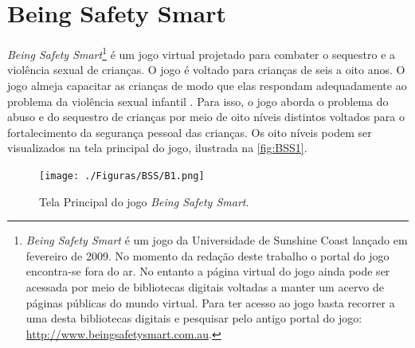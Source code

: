 
\section{Being Safety Smart}\label{sssec:Being}


\textit{Being Safety Smart}\footnote{\textit{Being Safety Smart} é um jogo  da Universidade de Sunshine Coast lançado em fevereiro de 2009. No momento da redação deste trabalho o portal do jogo encontra-se fora do ar. No entanto a página virtual do jogo ainda pode ser acessada por meio de bibliotecas digitais voltadas a manter um acervo de páginas públicas do mundo virtual. Para ter acesso ao jogo basta recorrer a uma desta bibliotecas digitais e pesquisar pelo antigo portal do jogo: \url{http://www.beingsafetysmart.com.au}.} é um jogo virtual projetado para combater o sequestro e a violência sexual de crianças. O jogo é voltado para crianças de seis a oito anos. O jogo almeja capacitar as crianças de modo que elas respondam adequadamente ao problema da violência sexual infantil \cite{jones2008online}. Para isso, o jogo aborda  o problema do abuso e do sequestro de crianças por meio de oito níveis distintos voltados para o fortalecimento da segurança pessoal das crianças. Os oito níveis podem ser visualizados na tela principal do jogo, ilustrada na \autoref{fig:BSS1}. 


\begin{figure}[htb]
	\caption{\label{fig:BSS1}Tela Principal do jogo \textit{Being Safety Smart}.}
  \begin{center}\vspace{-0.3cm}
    \texttt{[image: ./Figuras/BSS/B1.png]}
	\end{center}\vspace{-0.5cm}

\end{figure}

